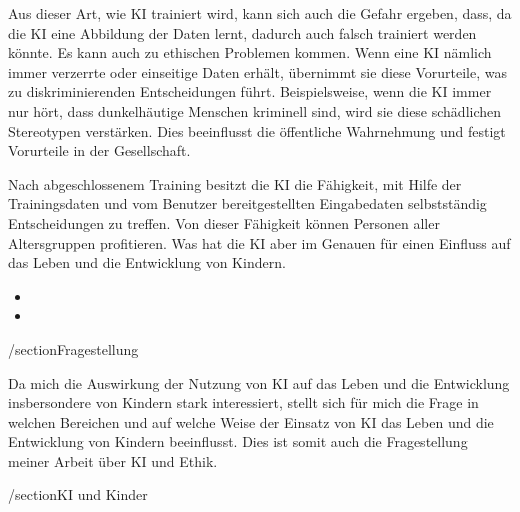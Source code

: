 \documentclass{article}
\begin{document}
Aus dieser Art, wie KI trainiert wird, kann sich auch die Gefahr ergeben, dass, da die KI eine Abbildung der Daten lernt, dadurch auch falsch trainiert werden könnte. Es kann auch zu ethischen Problemen kommen.
Wenn eine KI nämlich immer verzerrte oder einseitige Daten erhält, übernimmt sie diese Vorurteile, was zu diskriminierenden Entscheidungen führt. Beispielsweise, wenn die KI immer nur hört, dass dunkelhäutige Menschen kriminell sind, wird sie diese schädlichen Stereotypen verstärken. Dies beeinflusst die öffentliche Wahrnehmung und festigt Vorurteile in der Gesellschaft.

Nach abgeschlossenem Training besitzt die KI die Fähigkeit, mit Hilfe der Trainingsdaten und vom Benutzer bereitgestellten Eingabedaten selbstständig Entscheidungen zu treffen. Von dieser Fähigkeit können Personen aller Altersgruppen profitieren. Was hat die KI aber im Genauen für einen Einfluss auf das Leben und die Entwicklung von Kindern.

\begin{itemize}
    \item 
    \item 

\end{itemize}

/section{Fragestellung}

Da mich die Auswirkung der Nutzung von KI auf das Leben und die Entwicklung insbersondere von Kindern stark interessiert, stellt sich für mich die Frage in welchen Bereichen und auf welche Weise der Einsatz von KI das Leben und die Entwicklung von Kindern beeinflusst. Dies ist somit auch die Fragestellung meiner Arbeit über KI und Ethik. 

/section{KI und Kinder}





\printbibliography
\end{document}
